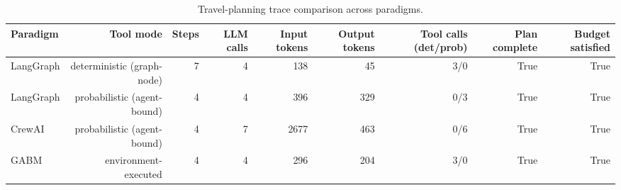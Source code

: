 \begin{table}[h]
\centering
\caption{Travel-planning trace comparison across paradigms.}
\begin{tabular}{lrrrrrrrr}
\toprule
Paradigm & Tool mode & Steps & LLM calls & Input tokens & Output tokens & Tool calls (det/prob) & Plan complete & Budget satisfied \\
\midrule
LangGraph & deterministic (graph-node) & 7 & 4 & 138 & 45 & 3/0 & True & True \\
LangGraph & probabilistic (agent-bound) & 4 & 4 & 396 & 329 & 0/3 & True & True \\
CrewAI & probabilistic (agent-bound) & 4 & 7 & 2677 & 463 & 0/6 & True & True \\
GABM & environment-executed & 4 & 4 & 296 & 204 & 3/0 & True & True \\
\bottomrule
\end{tabular}
\end{table}
